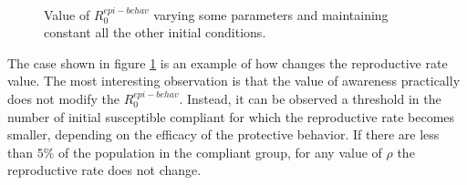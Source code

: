 \begin{figure}[h]
	\centering
	 \quad
	 \\
	\caption[Epidemic behavioral $R_0$ coefficients ]{Value of $R_0^{epi-behav}$ varying some parameters and maintaining constant all the other initial conditions.}
	\label{fig:r0_epi_behav_coef}
\end{figure}


The case shown in figure \ref{fig:r0_epi_behav_coef} is an example of how changes the reproductive rate value. The most interesting observation is that the value of awareness practically does not modify the $R_0^{epi-behav}$. Instead, it can be observed a threshold in the number of initial susceptible compliant for which the reproductive rate becomes smaller, depending on the efficacy of the protective behavior. If there are less than $5\%$ of the population in the compliant group, for any value of $\rho$ the reproductive rate does not change. 
